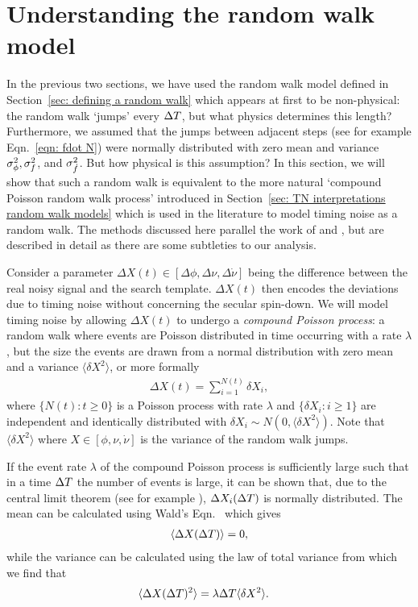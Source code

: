 \documentclass[../full_thesis/full_thesis.tex]{subfiles}
\begin{document}
\section{Understanding the random walk model}
\label{sec: understanding the random walk model}

In the previous two sections, we have used the random walk model
defined in Section~\ref{sec: defining a random walk} which appears at first to
be non-physical: the random walk `jumps' every $\Delta T$, but what
physics determines this length? Furthermore, we assumed that the jumps between
adjacent steps (see for example Eqn.~\eqref{eqn: fdot N}) were normally
distributed with zero mean and variance $\sigma_{\phi}^{2}, \sigma_{f}^{2}$, and $\sigma_{\dot{f}}^{2}$. But how
physical is this assumption?
In this section, we will show that such a
random walk is equivalent to the more natural `compound Poisson random walk
process' introduced in Section~\ref{sec: TN interpretations random walk models}
which is used in the literature to model timing noise as a random walk.  The
methods discussed here parallel the work of \citet{Groth1975} and
\citet{Cordes1980}, but are described in detail as there are some subtleties to
our analysis.

Consider a parameter $\Delta X(t) \in [\Delta\phi, \Delta\nu,\Delta\dot{\nu}]$ being
the difference between the real noisy signal and the search template. $\Delta
X(t)$ then encodes the deviations due to timing noise without concerning the
secular spin-down.  We will model timing noise by allowing $\Delta X(t)$ to
undergo a \emph{compound Poisson process}: a random walk where events are
Poisson distributed in time occurring with a rate $\lambda$, but the size the
events are drawn from a normal distribution with zero mean and a variance
$\langle \delta X^{2} \rangle$, or more formally
\begin{align}
\Delta X(t) = \sum_{i=1}^{N(t)} \delta X_i,
\label{eqn: X def}
\end{align}
where $\{ N(t): t \ge 0\}$ is a Poisson process with rate $\lambda$ and
$\{\delta X_i: i \ge 1\}$ are independent and identically distributed with
$\delta X_i \sim N(0, \langle \delta X^{2}\rangle)$. Note that $\langle \delta X^{2} \rangle$
where $X \in [\phi, \nu, \dot{\nu}]$ is the variance of the random walk jumps.

If the event rate $\lambda$ of the compound Poisson process is sufficiently
large such that in a time $\Delta T$ the number of events is large, it can be shown
that, due to the central limit theorem
(see for example \citet{weiss2006course}), $\Delta X_i(\Delta T)$ is normally
distributed. The mean can be calculated using Wald's
Eqn.~\citep{wald1944cumulative} which gives
\begin{align}
\langle \Delta X(\Delta T) \rangle = 0,
\label{eqn: DX mean}
\end{align}
while the variance can be calculated using the law of total variance
\citep{weiss2006course} from which we find that
\begin{align}
\langle \Delta X(\Delta T)^{2} \rangle &  = \lambda \Delta T \langle \delta X^{2}\rangle.
\label{eqn: DX var}
\end{align}
\end{document}
